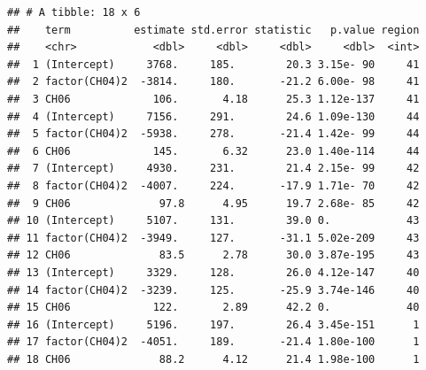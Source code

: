 \documentclass[]{book}
\newenvironment{Shaded}{\begin{snugshade}}{\end{snugshade}}
\newcommand{\ControlFlowTok}[1]{\textcolor[rgb]{0.13,0.29,0.53}{\textbf{#1}}}
\newcommand{\DataTypeTok}[1]{\textcolor[rgb]{0.13,0.29,0.53}{#1}}
\newcommand{\KeywordTok}[1]{\textcolor[rgb]{0.13,0.29,0.53}{\textbf{#1}}}
\newcommand{\NormalTok}[1]{#1}
\newcommand{\OperatorTok}[1]{\textcolor[rgb]{0.81,0.36,0.00}{\textbf{#1}}}
\newcommand{\StringTok}[1]{\textcolor[rgb]{0.31,0.60,0.02}{#1}}
\begin{document}
\begin{Shaded}
\end{Shaded}

\begin{verbatim}
## # A tibble: 18 x 6
##    term          estimate std.error statistic   p.value region
##    <chr>            <dbl>     <dbl>     <dbl>     <dbl>  <int>
##  1 (Intercept)     3768.     185.        20.3 3.15e- 90     41
##  2 factor(CH04)2  -3814.     180.       -21.2 6.00e- 98     41
##  3 CH06             106.       4.18      25.3 1.12e-137     41
##  4 (Intercept)     7156.     291.        24.6 1.09e-130     44
##  5 factor(CH04)2  -5938.     278.       -21.4 1.42e- 99     44
##  6 CH06             145.       6.32      23.0 1.40e-114     44
##  7 (Intercept)     4930.     231.        21.4 2.15e- 99     42
##  8 factor(CH04)2  -4007.     224.       -17.9 1.71e- 70     42
##  9 CH06              97.8      4.95      19.7 2.68e- 85     42
## 10 (Intercept)     5107.     131.        39.0 0.            43
## 11 factor(CH04)2  -3949.     127.       -31.1 5.02e-209     43
## 12 CH06              83.5      2.78      30.0 3.87e-195     43
## 13 (Intercept)     3329.     128.        26.0 4.12e-147     40
## 14 factor(CH04)2  -3239.     125.       -25.9 3.74e-146     40
## 15 CH06             122.       2.89      42.2 0.            40
## 16 (Intercept)     5196.     197.        26.4 3.45e-151      1
## 17 factor(CH04)2  -4051.     189.       -21.4 1.80e-100      1
## 18 CH06              88.2      4.12      21.4 1.98e-100      1
\end{verbatim}
\end{document}
